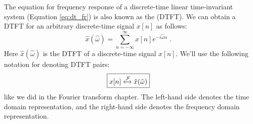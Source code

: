 The equation for frequency response of a discrete-time linear
time-invariant system (Equation \ref{eq:dt_fr}) is also known as the
\emph{} (DTFT).
We can obtain a DTFT for an arbitrary discrete-time signal $x[n]$ as
follows:
\begin{equation}
    \boxed{
        \hat{x}(\hat{\omega}) = \sum_{n=-\infty}^{\infty} x[n] e^{-i\hat{\omega} n}\,\,.
    }
    \label{eq:dtft_eq}
\end{equation}
Here $\hat{x}(\hat{\omega})$ is the DTFT of a discrete-time signal
$x[n]$. We'll use the following notation for denoting DTFT pairs:
\begin{equation}
    \boxed{
        x[n] \xleftrightarrow{\mathcal{F}} \hat{x}(\hat{\omega})
    }
\end{equation}
like we did in the Fourier transform chapter. The left-hand side
denotes the time domain representation, and the right-hand side
denotes the frequency domain representation.


